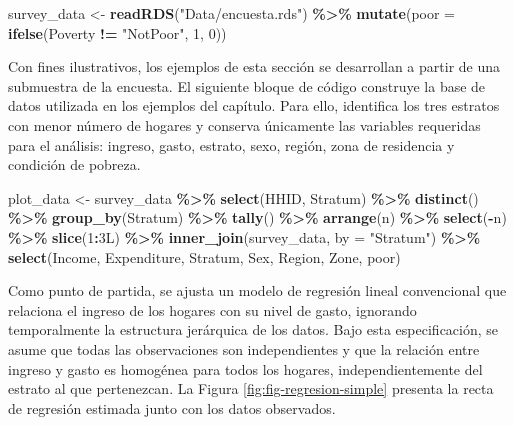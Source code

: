 \documentclass[
  spanish,
  12pt,
]{book}
\newenvironment{Shaded}{\begin{snugshade}}{\end{snugshade}}
\newcommand{\AttributeTok}[1]{\textcolor[rgb]{0.13,0.29,0.53}{#1}}
\newcommand{\DataTypeTok}[1]{\textcolor[rgb]{0.13,0.29,0.53}{#1}}
\newcommand{\DecValTok}[1]{\textcolor[rgb]{0.00,0.00,0.81}{#1}}
\newcommand{\FunctionTok}[1]{\textcolor[rgb]{0.13,0.29,0.53}{\textbf{#1}}}
\newcommand{\NormalTok}[1]{#1}
\newcommand{\OtherTok}[1]{\textcolor[rgb]{0.56,0.35,0.01}{#1}}
\newcommand{\SpecialCharTok}[1]{\textcolor[rgb]{0.81,0.36,0.00}{\textbf{#1}}}
\newcommand{\StringTok}[1]{\textcolor[rgb]{0.31,0.60,0.02}{#1}}
\begin{document}
\begin{Shaded}
\begin{Highlighting}[]
\NormalTok{survey\_data }\OtherTok{\textless{}{-}} \FunctionTok{readRDS}\NormalTok{(}\StringTok{"Data/encuesta.rds"}\NormalTok{) }\SpecialCharTok{\%\textgreater{}\%}
  \FunctionTok{mutate}\NormalTok{(}\AttributeTok{poor =} \FunctionTok{ifelse}\NormalTok{(Poverty }\SpecialCharTok{!=} \StringTok{"NotPoor"}\NormalTok{, }\DecValTok{1}\NormalTok{, }\DecValTok{0}\NormalTok{))}
\end{Highlighting}
\end{Shaded}

Con fines ilustrativos, los ejemplos de esta sección se desarrollan a partir de una submuestra de la encuesta. El siguiente bloque de código construye la base de datos utilizada en los ejemplos del capítulo. Para ello, identifica los tres estratos con menor número de hogares y conserva únicamente las variables requeridas para el análisis: ingreso, gasto, estrato, sexo, región, zona de residencia y condición de pobreza.

\begin{Shaded}
\begin{Highlighting}[]
\NormalTok{plot\_data }\OtherTok{\textless{}{-}}\NormalTok{ survey\_data }\SpecialCharTok{\%\textgreater{}\%}
  \FunctionTok{select}\NormalTok{(HHID, Stratum) }\SpecialCharTok{\%\textgreater{}\%}
  \FunctionTok{distinct}\NormalTok{() }\SpecialCharTok{\%\textgreater{}\%}
  \FunctionTok{group\_by}\NormalTok{(Stratum) }\SpecialCharTok{\%\textgreater{}\%}
  \FunctionTok{tally}\NormalTok{() }\SpecialCharTok{\%\textgreater{}\%}
  \FunctionTok{arrange}\NormalTok{(n) }\SpecialCharTok{\%\textgreater{}\%}
  \FunctionTok{select}\NormalTok{(}\SpecialCharTok{{-}}\NormalTok{n) }\SpecialCharTok{\%\textgreater{}\%}
  \FunctionTok{slice}\NormalTok{(}\DecValTok{1}\SpecialCharTok{:}\DecValTok{3}\DataTypeTok{L}\NormalTok{) }\SpecialCharTok{\%\textgreater{}\%}
  \FunctionTok{inner\_join}\NormalTok{(survey\_data, }\AttributeTok{by =} \StringTok{"Stratum"}\NormalTok{) }\SpecialCharTok{\%\textgreater{}\%}
  \FunctionTok{select}\NormalTok{(Income, Expenditure, Stratum, Sex, Region, Zone, poor)}
\end{Highlighting}
\end{Shaded}

Como punto de partida, se ajusta un modelo de regresión lineal convencional que relaciona el ingreso de los hogares con su nivel de gasto, ignorando temporalmente la estructura jerárquica de los datos. Bajo esta especificación, se asume que todas las observaciones son independientes y que la relación entre ingreso y gasto es homogénea para todos los hogares, independientemente del estrato al que pertenezcan. La Figura \ref{fig:fig-regresion-simple} presenta la recta de regresión estimada junto con los datos observados.
\end{document}
